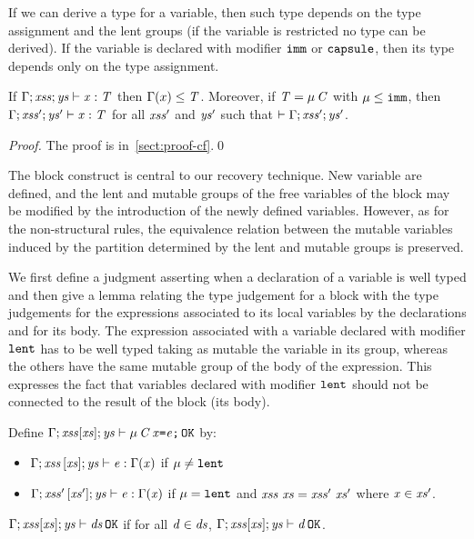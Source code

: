 { {If we can derive a type for a variable, then such type depends on the type assignment and the lent groups (if the variable is restricted no type can be derived).
If the variable is declared with modifier $\texttt{imm}$ or $\texttt{capsule}$, then its type depends only on the type assignment.}
\begin{lemma}\label{lemma:typeVars}
If $\Gamma;\mathit{xss};\mathit{ys}\vdash {\mathit{x}}:\mathit{T}$ then $\Gamma(x)\leq\mathit{T}$. Moreover, if 
$\mathit{T}=\mu\,\mathit{C}$ with $\mu\leq\texttt{imm}$, then $\Gamma;\mathit{xss}';\mathit{ys}'\vdash {\mathit{x}}:\mathit{T}$ for all 
$\mathit{xss}'$ and $\mathit{ys}'$ such that  $\vdash\Gamma;{\mathit{xss}'};\mathit{ys}'$.
\end{lemma}
\begin{proof}
The proof is in~\ref{sect:proof-cf}.\qed
\end{proof}
The block construct is central to our recovery technique. New variable are defined, and the lent and mutable
groups of the free variables of the block may be modified by the introduction of the newly defined
variables. However, as for the non-structural rules, the equivalence relation between the mutable 
variables induced by the partition determined by the lent and   mutable groups is preserved.

We first define a judgment asserting when a declaration of a variable is well typed and then give a lemma
relating the type judgement for a  block with the type judgements for the expressions
associated to its local variables by the declarations and for its body. The expression associated
with a variable declared with modifier $\texttt{lent}$ has to be well typed taking as mutable the variable in its
group, whereas the others have the same mutable group of the body of the expression.  This expresses
the fact that variables declared with modifier $\texttt{lent}$ should not be connected to the result of the block
(its body).
\begin{definition}\label{def:wellTypedDefsNew}
Define $\Gamma;\mathit{xss}[\mathit{xs}];\mathit{ys}\vdash \mu\,\mathit{C}\,\mathit{x}\texttt{=}\mathit{e}\texttt{;}\,{\tt OK}$ by:
\begin{itemize}
  \item $\Gamma;\mathit{xss}\,[\mathit{xs}];\mathit{ys}\vdash \mathit{e}:\Gamma(\mathit{x})$ if $\mu\not=\texttt{lent}$
  \item $\Gamma;\mathit{xss}'\,[\mathit{xs}'];\mathit{ys}\vdash \mathit{e}:\Gamma(\mathit{x})$ if $\mu=\texttt{lent}$ and $\mathit{xss}\ \mathit{xs}=\mathit{xss}'\ \mathit{xs}'$ where $\mathit{x}\in\mathit{xs}'$.
\end{itemize}
$\Gamma;\mathit{xss}[\mathit{xs}];\mathit{ys}\vdash \mathit{ds}\,{\tt OK}$ if for all $\mathit{d}\in\mathit{ds}$, $\Gamma;\mathit{xss}[\mathit{xs}];\mathit{ys}\vdash \mathit{d}\,{\tt OK}$.
\end{definition}

}
